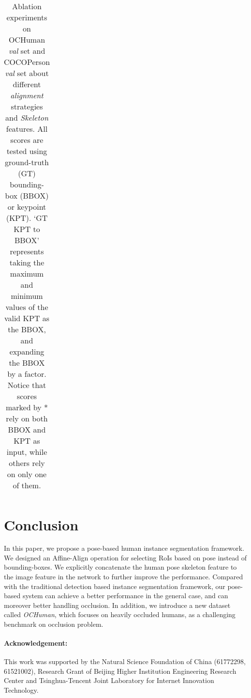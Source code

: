 \documentclass[10pt,twocolumn,letterpaper]{article}
\begin{document}
\begin{table}[t]
\begin{center}
\begin{tabularx}{\linewidth}{|Y|Y|>{\centering\arraybackslash}p{0.9cm}|Y|Y|}
\hline
\end{tabularx}
\end{center}
\setlength{\abovecaptionskip}{-0.1cm}
\setlength{\belowcaptionskip}{-0.4cm}
\caption{Ablation experiments on OCHuman \emph{val} set and COCOPerson \emph{val} set about different \emph{alignment} strategies and \emph{Skeleton} features. All scores are tested using ground-truth (GT) bounding-box (BBOX) or keypoint (KPT). `GT KPT to BBOX' represents taking the maximum and minimum values of the valid KPT as the BBOX, and expanding the BBOX by a factor. Notice that scores marked by * rely on both BBOX and KPT as input, while others rely on only one of them.}
\label{table:noSkel}
\end{table}

 \section{Conclusion}

In this paper, we propose a pose-based human instance segmentation framework. We designed an Affine-Align operation for
selecting RoIs based on pose instead of bounding-boxes. We explicitly concatenate the human pose skeleton feature to the image
feature in the network to further improve the performance. Compared with the traditional detection based instance segmentation
framework, our pose-based system can achieve a better performance in the general case, and can moreover better handling
occlusion. In addition, we introduce a new dataset called \emph{OCHuman}, which focuses on heavily occluded humans, as a challenging benchmark on occlusion problem.


\vspace{-0.3cm}
{ \paragraph{ Acknowledgement:} This work was supported by the Natural Science Foundation of China (61772298, 61521002), Research Grant of Beijing Higher Institution Engineering Research Center and Tsinghua-Tencent Joint Laboratory for Internet Innovation Technology.}

 
{\small


}
\end{document}
